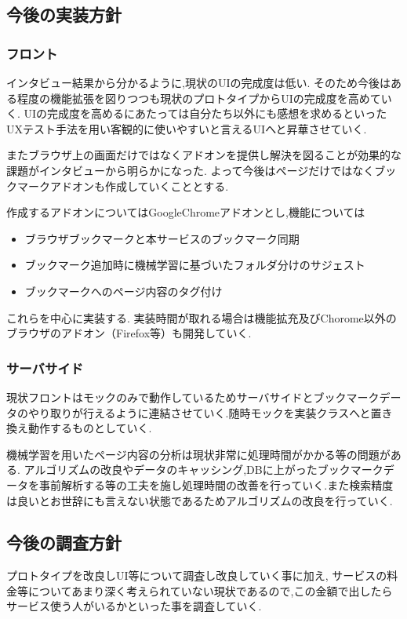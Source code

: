 \documentclass[a4paper,10pt,fleqn]{jsarticle}
\begin{document}
\subsection{今後の実装方針}
\subsubsection{フロント}
インタビュー結果から分かるように,現状のUIの完成度は低い.
そのため今後はある程度の機能拡張を図りつつも現状のプロトタイプからUIの完成度を高めていく. UIの完成度を高めるにあたっては自分たち以外にも感想を求めるといったUXテスト手法を用い客観的に使いやすいと言えるUIへと昇華させていく.
\par またブラウザ上の画面だけではなくアドオンを提供し解決を図ることが効果的な課題がインタビューから明らかになった. よって今後はページだけではなくブックマークアドオンも作成していくこととする.
\par 作成するアドオンについてはGoogleChromeアドオンとし,機能については
\begin{itemize}
  \item ブラウザブックマークと本サービスのブックマーク同期
  \item ブックマーク追加時に機械学習に基づいたフォルダ分けのサジェスト
  \item ブックマークへのページ内容のタグ付け
\end{itemize}
これらを中心に実装する. 実装時間が取れる場合は機能拡充及びChorome以外のブラウザのアドオン（Firefox等）も開発していく.

\subsubsection{サーバサイド}
現状フロントはモックのみで動作しているためサーバサイドとブックマークデータのやり取りが行えるように連結させていく.随時モックを実装クラスへと置き換え動作するものとしていく.
\par 機械学習を用いたページ内容の分析は現状非常に処理時間がかかる等の問題がある. アルゴリズムの改良やデータのキャッシング,DBに上がったブックマークデータを事前解析する等の工夫を施し処理時間の改善を行っていく.また検索精度は良いとお世辞にも言えない状態であるためアルゴリズムの改良を行っていく.

\subsection{今後の調査方針}
プロトタイプを改良しUI等について調査し改良していく事に加え,
サービスの料金等についてあまり深く考えられていない現状であるので,この金額で出したらサービス使う人がいるかといった事を調査していく.
\end{document}
